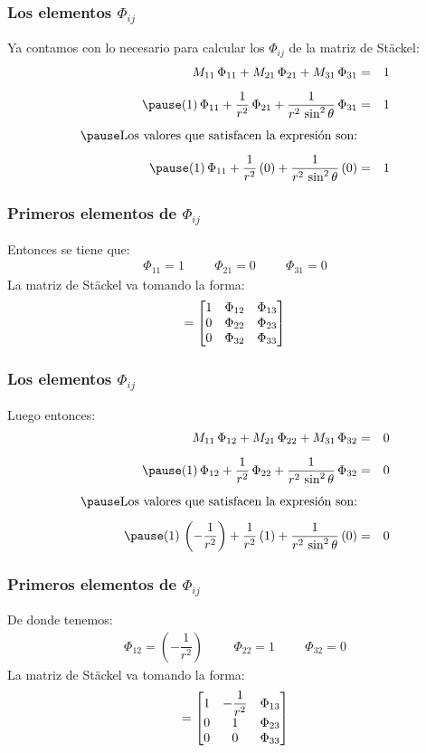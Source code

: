\documentclass[12pt]{beamer}
\begin{document}
\begin{frame}
\frametitle{Los elementos $\Phi_{ij}$}
Ya contamos con lo necesario para calcular los $\Phi_{ij}$ de la matriz de Stäckel:
\begin{eqnarray*}
M_{11} \, \Phi_{11} + M_{21} \, \Phi_{21} + M_{31} \, \Phi_{31} &=& 1 \\[0.5em] \pause
(1) \, \Phi_{11} + \dfrac{1}{r^{2}} \, \Phi_{21} + \dfrac{1}{r^{2} \, \sin^{2} \theta}  \, \Phi_{31} &=& 1 \\[0.5em] \pause
\mbox{Los valores que satisfacen la expresión son:} \\[0.5em] \pause
(1) \, \Phi_{11} + \dfrac{1}{r^{2}} \, (0) + \dfrac{1}{r^{2} \, \sin^{2} \theta}  \, (0) &=& 1
\end{eqnarray*}
\end{frame}
\begin{frame}
\frametitle{Primeros elementos de $\Phi_{ij}$}
Entonces se tiene que:
\pause
\begin{align*}
\Phi_{11} = 1 \hspace{1cm} \Phi_{21} = 0 \hspace{1cm} \Phi_{31} = 0 
\end{align*}
\pause
La matriz de Stäckel va tomando la forma:
\pause
\begin{align*}
[S] = \mqty[
1 & \Phi_{12} & \Phi_{13} \\
0 & \Phi_{22} & \Phi_{23} \\
0 & \Phi_{32} & \Phi_{33}
]
\end{align*}  
\end{frame}
\begin{frame}
\frametitle{Los elementos $\Phi_{ij}$}
Luego entonces:
\begin{eqnarray*}
M_{11} \, \Phi_{12} + M_{21} \, \Phi_{22} + M_{31} \, \Phi_{32} &=& 0 \\[0.5em] \pause
(1) \, \Phi_{12} + \dfrac{1}{r^{2}} \, \Phi_{22} + \dfrac{1}{r^{2} \, \sin^{2} \theta}  \, \Phi_{32} &=& 0 \\[0.5em] \pause
\mbox{Los valores que satisfacen la expresión son:} \\[0.5em] \pause
(1) \, \left( - \dfrac{1}{r^{2}} \right) + \dfrac{1}{r^{2}} \, (1) + \dfrac{1}{r^{2} \, \sin^{2} \theta}  \, (0) &=& 0
\end{eqnarray*}
\end{frame}
\begin{frame}
\frametitle{Primeros elementos de $\Phi_{ij}$}
De donde tenemos:
\pause
\begin{align*}
\Phi_{12} = \left( - \dfrac{1}{r^{2}} \right) \hspace{1cm} \Phi_{22} = 1 \hspace{1cm} \Phi_{32} = 0 
\end{align*}
\pause
La matriz de Stäckel va tomando la forma:
\pause
\begin{align*}
[S] = \mqty[
1 & - \dfrac{1}{r^{2}} & \Phi_{13} \\
0 & 1 & \Phi_{23} \\
0 & 0 & \Phi_{33}
]
\end{align*}  
\end{frame}
\end{document}
